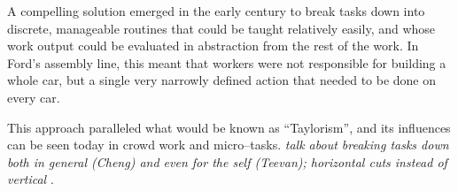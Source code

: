 \documentclass{sigchi}
\begin{document}
A compelling solution emerged in the early  century to break tasks down into discrete,
manageable routines that could be taught relatively easily,
and whose work output could be evaluated in abstraction from the rest of the work.
In Ford's assembly line, this meant that workers were not responsible for building a whole car,
but a single very narrowly defined action that needed to be done on every car.

This approach paralleled what would be known as ``Taylorism'',
and its influences can be seen today in crowd work and micro--tasks.
\textit{talk about breaking tasks down both in general (Cheng) and even for the self (Teevan);
horizontal cuts instead of vertical}
\cite{cheng2015break,writingMicroTasks}.







\end{document}

